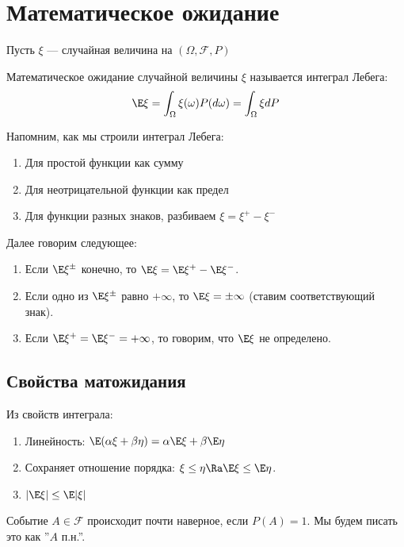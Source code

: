 \section{Математическое ожидание}
Пусть \(\xi\) --- случайная величина на \((\Omega, \mathcal{F}, P)\)
\begin{definition}
    Математическое ожидание случайной величины \(\xi\) называется интеграл Лебега:
    \[\E\xi = \int_{\Omega} \xi(\omega) P(d\omega) = \int_{\Omega} \xi dP\]
\end{definition}

\begin{reminder}
    Напомним, как мы строили интеграл Лебега:
    \begin{enumerate}
        \item Для простой функции как сумму
        \item Для неотрицательной функции как предел
        \item Для функции разных знаков, разбиваем \(\xi = \xi^+ - \xi^-\)
    \end{enumerate}
    Далее говорим следующее:
    \begin{enumerate}
        \item Если \(\E \xi^{\pm}\) конечно, то \(\E\xi = \E\xi^+ - \E\xi^-\).
        \item Если одно из \(\E\xi^{\pm}\) равно \(+\infty\), то \(\E\xi = \pm\infty\) (ставим соответствующий знак).
        \item Если \(\E\xi^+ = \E\xi^- = +\infty\), то говорим, что \(\E\xi\) не определено.
    \end{enumerate}
\end{reminder}

\subsection{Свойства матожидания}
Из свойств интеграла:
\begin{enumerate}
    \item Линейность: \(\E(\alpha\xi + \beta\eta) = \alpha\E\xi + \beta\E\eta\)
    \item Сохраняет отношение порядка: \(\xi \le \eta \Ra \E\xi \le \E\eta\).
    \item \(|\E\xi| \le \E|\xi|\)
\end{enumerate}

\begin{definition}
    Событие \(A \in \mathcal{F}\) происходит почти наверное, если \(P(A) = 1\). Мы будем писать это как ''\(A\) п.н.''.
\end{definition}

